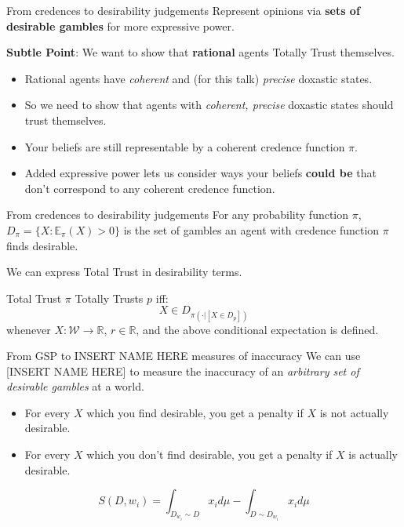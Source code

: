 \documentclass[aspectratio=169, dvipsnames]{beamer}
\newcommand{\R}{\mathbb{R}}
\newcommand{\E}{\mathbb{E}}
\newcommand{\W}{\mathcal{W}}
\begin{document}
\begin{frame}{From credences to desirability judgements}
  Represent opinions via \alert{\textbf{sets of desirable gambles}} for more expressive power.

  \textbf{Subtle Point}: We want to show that \alert{\textbf{rational}} agents Totally Trust themselves.
  \begin{itemize}
    \item Rational agents have \textit{coherent} and (for this talk) \textit{precise} doxastic states.
    \item So we need to show that agents with \textit{coherent, precise} doxastic states should trust themselves. 
    \item Your beliefs are still representable by a coherent credence function $\pi$.
    \item Added expressive power lets us consider ways your beliefs \textbf{\alert{could be}}
      that don't correspond to any coherent credence function.
  \end{itemize}
\end{frame}

\begin{frame}{From credences to desirability judgements}
  For any probability function $\pi$, $D_{\pi} = \{X : \E_{\pi}(X) > 0\}$ is the set of gambles an agent with credence function
  $\pi$ finds desirable.
  
  We can express Total Trust in desirability terms.
  \begin{block}{Total Trust}
    $\pi$ Totally Trusts $p$ iff:
    \begin{equation}
      \label{totTrust}
      X \in D_{\pi(\cdot| [X \in D_p])}
    \end{equation}
    whenever $X: \W \to \R$, $r \in \R$, and the above conditional expectation is defined.
  \end{block}
\end{frame}

\begin{frame}{From GSP to INSERT NAME HERE measures of inaccuracy}
  We can use [INSERT NAME HERE] to measure the inaccuracy of an \textit{arbitrary set of desirable gambles} at a
  world.
  \begin{itemize}
  \item For every $X$ which you find desirable, you get a penalty if $X$ is not actually desirable.
  \item For every $X$ which you don't find desirable, you get a penalty if $X$ is actually desirable.
  \end{itemize}
  \begin{equation}
      \label{KonekScoreDefAppendix}
      S(D, w_i) = \int_{D_{w_i} \sim D} x_i d\mu - \int_{D \sim D_{w_i}} x_i d\mu 
    \end{equation}
\end{frame}
\end{document}
